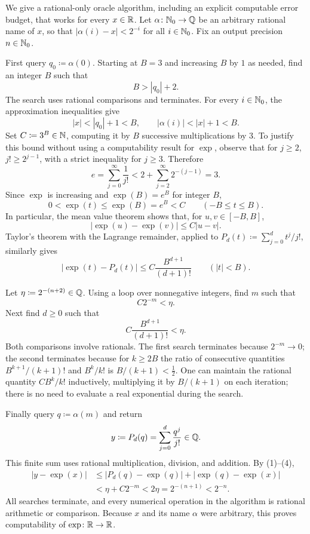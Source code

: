 \documentclass[11pt, oneside]{article}
\begin{document}
\begin{solution}
\begin{problemsubparts}
    \item We give a rational-only oracle algorithm, including an explicit
    computable error budget, that works for every $x\in\mathbb{R}$.
    Let $\alpha\colon\mathbb{N}_0\to\mathbb{Q}$ be an arbitrary rational name of $x$,
    so that $|\alpha(i)-x|<2^{-i}$ for all $i\in\mathbb{N}_0$.
    Fix an output precision $n\in\mathbb{N}_0$.

    First query $q_0\coloneqq\alpha(0)$. Starting at $B=3$ and
    increasing $B$ by $1$ as needed, find an integer $B$ such that
    \[
        B>|q_0|+2.
    \]
    The search uses rational comparisons and terminates. For every
    $i\in\mathbb{N}_0$, the approximation inequalities give
    \[
       |x|<|q_0|+1<B,
       \qquad |\alpha(i)|<|x|+1<B.
    \]
    Set $C\coloneqq3^B\in\mathbb{N}$, computing it by $B$ successive
    multiplications by $3$.
    To justify this bound without using a computability result for
    $\exp$, observe that for $j\ge2$, $j!\ge2^{j-1}$, with a strict
    inequality for $j\ge3$. Therefore
    \[
      e=\sum_{j=0}^{\infty}\frac1{j!}
      <2+\sum_{j=2}^{\infty}2^{-(j-1)}=3.
    \]
    Since $\exp$ is increasing and $\exp(B)=e^B$ for integer $B$,
    \[
      0<\exp(t)\le\exp(B)=e^B<C
      \qquad(-B\le t\le B).
    \]
    In particular, the mean value theorem shows that, for
    $u, v\in[-B, B]$,
    \[
       |\exp(u)-\exp(v)|\le C|u-v|.
       \tag{1}
    \]
    Taylor's theorem with the Lagrange remainder, applied to
    $P_d(t)\coloneqq\sum_{j=0}^{d}t^j/j!$, similarly gives
    \[
       |\exp(t)-P_d(t)|
       \le C\frac{B^{d+1}}{(d+1)!}
       \qquad(|t|<B).
       \tag{2}
    \]

    Let $\eta\coloneqq2^{-(n+2)}\in\mathbb{Q}$. Using a loop over
    nonnegative integers, find $m$ such that
    \[
       C2^{-m}<\eta.
       \tag{3}
    \]
    Next find $d\ge0$ such that
    \[
       C\frac{B^{d+1}}{(d+1)!}<\eta.
       \tag{4}
    \]
    Both comparisons involve rationals. The first search terminates
    because $2^{-m}\to0$; the second terminates because for
    $k\ge2B$ the ratio of consecutive quantities
    $B^{k+1}/(k+1)!$ and $B^k/k!$ is $B/(k+1)<\tfrac12$.
    One can maintain the rational quantity $CB^k/k!$ inductively,
    multiplying it by $B/(k+1)$ on each iteration; there is no need to
    evaluate a real exponential during the search.

    Finally query $q\coloneqq\alpha(m)$ and return
    \[
         y\coloneqq P_d(q)=\sum_{j=0}^{d}\frac{q^j}{j!}\in\mathbb{Q}.
    \]
    This finite sum uses rational multiplication, division, and addition.
    By (1)--(4),
    \begin{align*}
       |y-\exp(x)|
       &\le |P_d(q)-\exp(q)|+|\exp(q)-\exp(x)|\\
       &<\eta+C2^{-m}<2\eta=2^{-(n+1)}<2^{-n}.
    \end{align*}
    All searches terminate, and every numerical operation in the
    algorithm is rational arithmetic or comparison. Because $x$ and its
    name $\alpha$ were arbitrary, this proves computability of
    $\exp\colon\mathbb{R}\to\mathbb{R}$.


\end{problemsubparts}
\end{solution}
\end{document}
